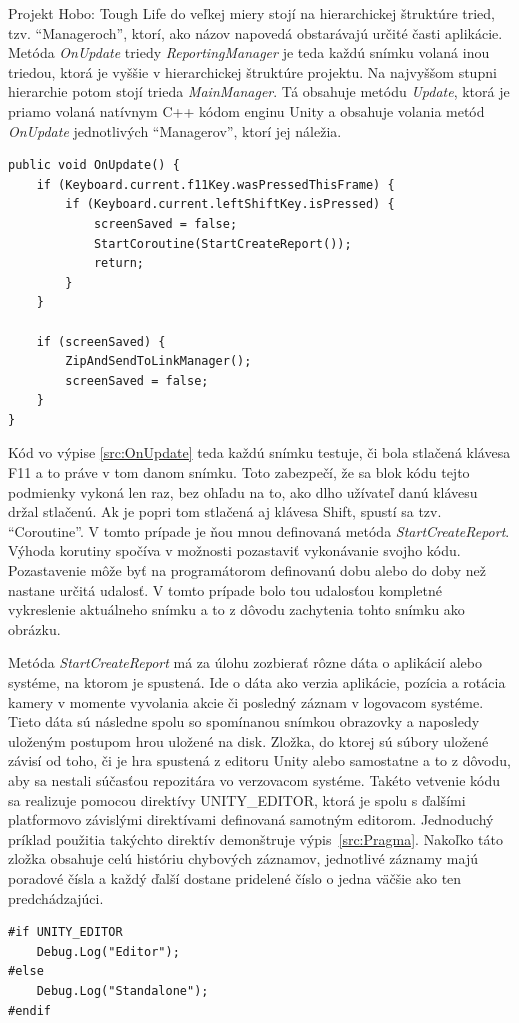 \documentclass[slovak, bachelorpractice]{diploma}
\begin{document}
Projekt Hobo: Tough Life do veľkej miery stojí na hierarchickej štruktúre tried, tzv. \enquote{Manageroch}, ktorí, ako názov napovedá obstarávajú určité časti aplikácie. Metóda \textit{OnUpdate} triedy \textit{ReportingManager} je teda každú snímku volaná inou triedou, ktorá je vyššie v hierarchickej štruktúre projektu. Na najvyššom stupni hierarchie potom stojí trieda \textit{MainManager}. Tá obsahuje metódu \textit{Update}, ktorá je priamo volaná natívnym C++ kódom enginu Unity a obsahuje volania metód \textit{OnUpdate} jednotlivých \enquote{Managerov}, ktorí jej náležia.
\vspace{10pt}
\begin{lstlisting}[label=src:OnUpdate,caption={Odchytenie stlačenia klávesovej skratky v spustenej hre}]
public void OnUpdate() {
    if (Keyboard.current.f11Key.wasPressedThisFrame) {
        if (Keyboard.current.leftShiftKey.isPressed) {
            screenSaved = false;
            StartCoroutine(StartCreateReport());
            return;
        }
    }

    if (screenSaved) {
        ZipAndSendToLinkManager();
        screenSaved = false;
    }
}
\end{lstlisting}

Kód vo výpise \ref{src:OnUpdate} teda každú snímku testuje, či bola stlačená klávesa F11 a to práve v tom danom snímku. Toto zabezpečí, že sa blok kódu tejto podmienky vykoná len raz, bez ohľadu na to, ako dlho užívateľ danú klávesu držal stlačenú. Ak je popri tom stlačená aj klávesa Shift, spustí sa tzv. \enquote{Coroutine}. V tomto prípade je ňou mnou definovaná metóda \textit{StartCreateReport}. Výhoda korutiny spočíva v možnosti pozastaviť vykonávanie svojho kódu. Pozastavenie môže byť na programátorom definovanú dobu alebo do doby než nastane určitá udalosť. V tomto prípade bolo tou udalosťou kompletné vykreslenie aktuálneho snímku a to z dôvodu zachytenia tohto snímku ako obrázku.

Metóda \textit{StartCreateReport} má za úlohu zozbierať rôzne dáta o aplikácií alebo systéme, na ktorom je spustená. Ide o dáta ako verzia aplikácie, pozícia a rotácia kamery v momente vyvolania akcie či posledný záznam v logovacom systéme. Tieto dáta sú následne spolu so spomínanou snímkou obrazovky a naposledy uloženým postupom hrou uložené na disk. Zložka, do ktorej sú súbory uložené závisí od toho, či je hra spustená z editoru Unity alebo samostatne a to z dôvodu, aby sa nestali súčasťou repozitára vo verzovacom systéme. Takéto vetvenie kódu sa realizuje pomocou direktívy UNITY\_EDITOR, ktorá je spolu s ďalšími platformovo závislými direktívami definovaná samotným editorom. Jednoduchý príklad použitia takýchto direktív demonštruje \mbox{výpis \ref{src:Pragma}}. Nakoľko táto zložka obsahuje celú históriu chybových záznamov, jednotlivé záznamy majú poradové čísla a každý ďalší dostane pridelené číslo o jedna väčšie ako ten predchádzajúci.
\vspace{10pt}
\begin{lstlisting}[label=src:Pragma,caption={Ukážka použitia direktívy UNITY\_EDITOR}]
#if UNITY_EDITOR
	Debug.Log("Editor");                
#else
    Debug.Log("Standalone");             
#endif
\end{lstlisting}
\end{document}

